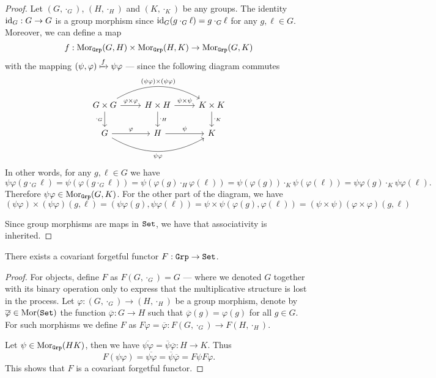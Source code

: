 \begin{proof}
    Let \((G, \cdot_G)\), \((H, \cdot_H)\) and \((K, \cdot_K)\) be any
    groups. The identity \(\operatorname{id}_G: G \to G\) is a group morphism since \(\operatorname{id}_G(g
    \cdot_G \ell) = g \cdot_G \ell\) for any \(g, \ell \in G\). Moreover,
    we can define a map
    \[
        f: \operatorname{Mor}_{{\texttt{Grp}}}(G, H) \times \operatorname{Mor}_{{\texttt{Grp}}}(H, K) \to \operatorname{Mor}_{{\texttt{Grp}}}(G, K)
    \]
    with the mapping \((\psi, \varphi) \xmapsto f \psi \varphi\) --- since
    the following diagram commutes
    \[
        \begin{tikzcd}
            G \times G \ar[r, "\varphi \times \varphi"]
            \ar[d, swap, "\cdot_G"]
            \ar[rr, bend left, "(\psi \varphi) \times (\psi \varphi)"]
            &H \times H \ar[r, "\psi \times \psi"]
            \ar[d, "\cdot_H"]
            &K \times K \ar[d, "\cdot_K"]
            \\
            G \ar[r, "\varphi"]
            \ar[rr, bend right, swap, "\psi \varphi"]
            &H \ar[r, "\psi"] &K
        \end{tikzcd}
    \]
    In other words, for any \(g, \ell \in G\) we have
    \[
        \psi \varphi (g \cdot_G \ell)
        = \psi(\varphi(g \cdot_G \ell))
        = \psi(\varphi(g) \cdot_H \varphi(\ell))
        = \psi(\varphi(g)) \cdot_K \psi(\varphi(\ell))
        = \psi \varphi(g) \cdot_K \psi \varphi(\ell).
    \]
    Therefore \(\psi \varphi \in \operatorname{Mor}_{\texttt{Grp}}(G, K)\). For the other part of the
    diagram, we have
    \[
        (\psi \varphi) \times (\psi \varphi) (g, \ell)
        = (\psi \varphi(g), \psi \varphi(\ell))
        = \psi \times \psi(\varphi(g), \varphi(\ell))
        = (\psi \times \psi) (\varphi \times \varphi) (g, \ell)
    \]

    Since group morphisms are maps in \({\texttt{Set}}\), we have that associativity is
    inherited.
\end{proof}

\begin{proposition}\label{prop: forgetful-func-grp-set}
    There exists a covariant forgetful functor \(F: {\texttt{Grp}} \to {\texttt{Set}}\).
\end{proposition}

\begin{proof}
    For objects, define \(F\) as \(F(G, \cdot_G) = G\) --- where we denoted \(G\)
    together with its binary operation only to express that the multiplicative
    structure is lost in the process. Let \(\varphi: (G, \cdot_G) \to (H, \cdot_H)\)
    be a group morphism, denote by \(\overline \varphi \in \operatorname{Mor}({\texttt{Set}})\) the function
    \(\overline\varphi: G \to H\) such that \(\overline\varphi(g) = \varphi(g)\) for
    all \(g \in G\). For such morphisms we define \(F\) as \(F\varphi =
    \overline\varphi: F(G, \cdot_G) \to F(H, \cdot_H)\).

    Let \(\psi \in \operatorname{Mor}_{\texttt{Grp}}(H K)\), then we have
    \(\overline{\psi \varphi} = \overline \psi \overline \varphi: H \to K\). Thus
    \[
        F(\psi \varphi) = \overline{\psi \varphi}
        = \overline \psi \overline \varphi = F\psi F\varphi.
    \]
    This shows that \(F\) is a covariant forgetful functor.
\end{proof}

